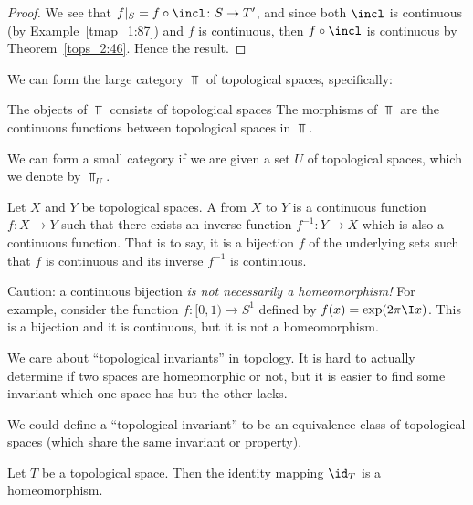\begin{proof}
We see that $f|_{S}=f\circ\incl\colon S\to T'$, and since both $\incl$
is continuous (by Example~\ref{tmap_1:87}) and $f$ is continuous, then
$f\circ\incl$ is continuous by Theorem~\ref{tops_2:46}. Hence the result.
\end{proof}

\begin{remark}
We can form the large category $\Top$ of topological spaces, specifically:
\begin{itemize}
 The objects of $\Top$ consists of topological spaces
 The morphisms of $\Top$ are the continuous
  functions between topological spaces in $\Top$.
\end{itemize}%
We can form a small category if we are given a set $U$ of topological
spaces, which we denote by $\Top_{U}$.
\end{remark}

\begin{definition}
Let $X$ and $Y$ be topological spaces. A  from
$X$ to $Y$ is a continuous function $f\colon X\to Y$ such that there
exists an inverse function $f^{-1}\colon Y\to X$ which is also a
continuous function. That is to say, it is a bijection $f$ of the
underlying sets such that $f$ is continuous and its inverse $f^{-1}$
is continuous.

Caution: a continuous bijection \emph{is not necessarily a homeomorphism!}
For example, consider the function $f\colon[0,1)\to S^{1}$ defined by
$f(x)=\exp(2\pi\I x)$. This is a bijection and it is continuous, but
it is not a homeomorphism.
\end{definition}

\begin{remark}
We care about ``topological invariants'' in topology. It is hard to
actually determine if two spaces are homeomorphic or not, but it is
easier to find some invariant which one space has but the other lacks.

We could define a ``topological invariant'' to be an equivalence class
of topological spaces (which share the same invariant or property).
\end{remark}

\begin{theorem}\label{topgrp_1:20}
Let $T$ be a topological space. Then the identity mapping $\id_{T}$ is
a homeomorphism.
\end{theorem}

